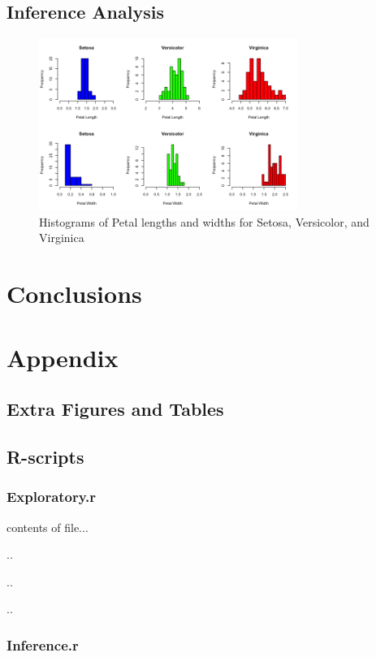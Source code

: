 \documentclass{article}
\begin{document}
\color{teal}
\subsection{Inference Analysis}

\begin{figure}[H]
	\centering
	\includegraphics[width=0.75\textwidth]{hist_iris.png}
	\caption{Histograms of Petal lengths and widths for Setosa, Versicolor, and
	Virginica}
	\label{fig:hist_iris}
\end{figure}

\section{Conclusions}

\newpage
\section{Appendix}

\subsection{Extra Figures and Tables} 
\subsection{R-scripts}
\subsubsection{Exploratory.r}

contents of file...

..

..

..

\subsubsection{Inference.r}
\end{document}
